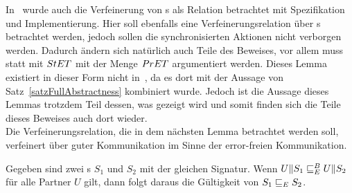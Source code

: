 In~\cite{Vogler2014EIO} wurde auch die Verfeinerung von \EIO{}s als Relation
betrachtet mit Spezifikation und Implementierung. Hier soll ebenfalls eine
Verfeinerungsrelation über \EIO{}s betrachtet werden, jedoch sollen die
synchronisierten Aktionen nicht verborgen werden. Dadurch ändern sich natürlich
auch Teile des Beweises, vor allem muss statt mit $StET{}$ mit der Menge
$PrET{}$ argumentiert werden. Dieses Lemma existiert in dieser Form nicht
in~\cite{Schlosser2012BA}, da es dort mit der Aussage von
Satz~\ref{satzFullAbstractness} kombiniert wurde. Jedoch ist die Aussage dieses
Lemmas trotzdem Teil dessen, was gezeigt wird und somit finden sich die Teile
dieses Beweises auch dort wieder.\\
Die Verfeinerungsrelation, die in dem nächsten Lemma betrachtet werden soll,
verfeinert über guter Kommunikation im Sinne der error-freien Kommunikation.

\begin{lem}
\label{lemVerfeinerung}
  Gegeben sind zwei \EIO{}s $S_1$ und $S_2$ mit der gleichen Signatur. Wenn
  $U\|S_1 \sqsubseteq _E^B U\|S_2$ für alle Partner $U$ gilt, dann folgt daraus die
  Gültigkeit von $S_1\sqsubseteq _E S_2$.
\end{lem}


